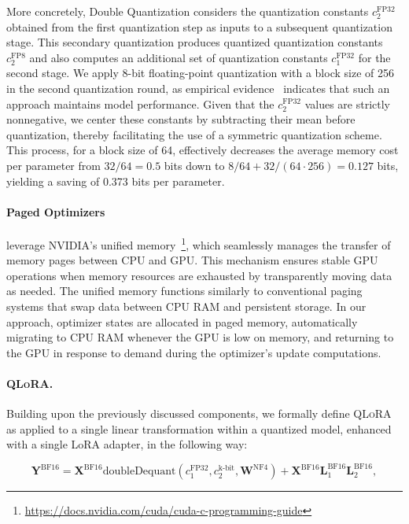 More concretely, Double Quantization considers the quantization constants $c_2^{\text{FP32}}$ obtained from the first quantization step as inputs to a subsequent quantization stage. This secondary quantization produces quantized quantization constants $c_2^{\text{FP8}}$ and also computes an additional set of quantization constants $c_1^{\text{FP32}}$ for the second stage. We apply 8-bit floating-point quantization with a block size of 256 in the second quantization round, as empirical evidence~\citep{dettmers2022case} indicates that such an approach maintains model performance. Given that the $c_2^{\text{FP32}}$ values are strictly nonnegative, we center these constants by subtracting their mean before quantization, thereby facilitating the use of a symmetric quantization scheme. This process, for a block size of 64, effectively decreases the average memory cost per parameter from $32/64 = 0.5$ bits down to $8/64 + 32/(64\cdot256) = 0.127$ bits, yielding a saving of 0.373 bits per parameter.

\paragraph{Paged Optimizers} leverage NVIDIA's unified memory~\footnote{\tiny \url{https://docs.nvidia.com/cuda/cuda-c-programming-guide}}, which seamlessly manages the transfer of memory pages between CPU and GPU. This mechanism ensures stable GPU operations when memory resources are exhausted by transparently moving data as needed. The unified memory functions similarly to conventional paging systems that swap data between CPU RAM and persistent storage. In our approach, optimizer states are allocated in paged memory, automatically migrating to CPU RAM whenever the GPU is low on memory, and returning to the GPU in response to demand during the optimizer's update computations.

\paragraph{\textsc{QLoRA}.} Building upon the previously discussed components, we formally define \textsc{QLoRA} as applied to a single linear transformation within a quantized model, enhanced with a single LoRA adapter, in the following way:

\begin{equation}
    \mathbf{Y}^{\text{BF16}} =  \mathbf{X}^{\text{BF16}} \text{doubleDequant}(c_1^{\text{FP32}}, c_2^{\text{k-bit}}, \mathbf{W}^{\text{NF4}}) + \mathbf{X}^{\text{BF16}}\mathbf{L}^{\text{BF16}}_1\mathbf{L}^{\text{BF16}}_2,
\end{equation}

